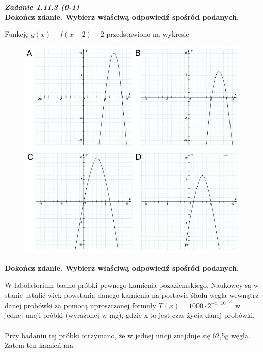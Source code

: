 \documentclass[12pt,a4paper]{article}
\theoremstyle{break}
\begin{document}
		\newpage
		\begin{mdframed}[%
			linecolor=white,%
			innertopmargin=\topskip,
			shadowsize=0,%
			innertopmargin=5,%
			innerbottommargin=5,%
			leftmargin=10,%
			rightmargin=10,%
			backgroundcolor=gray!20,%
			innertopmargin=0pt,]
			\vspace{0.2cm}
			\textbf{\textit{Zadanie 1.11.3 (0-1)}}\\
			\textbf{Dokończ zdanie. Wybierz właściwą odpowiedź spośród podanych.}
			
		\end{mdframed}
	
	Funkcję $g(x)-f(x-2)-2$ przedstawiono na wykresie
	
		\begin{figure}[h]
			\centering
			\includegraphics[scale=0.5]{pm2.jpeg}
		\end{figure}
	
	
	\begin{zad}[0-1]
		\textbf{Dokończ zdanie. Wybierz właściwą odpowiedź spośród podanych.}
	\end{zad} 
	
	W labolatorium badno próbki pewnego kamienia pozaziemskiego. Naukowcy są w stanie ustalić wiek powstania danego kamienia na postawie śladu węgla wewnątrz danej probówki za pomocą uproszczonej formuły $T(x)= 1000\cdot2^{-x \cdot 10^{-10}}$ w jednej uncji próbki (wyrażonej w mg), gdzie x to jest czas życia danej probówki.
	\\\\
	Przy badaniu tej próbki otrzymano, że w jednej uncji znajduje się 62,5g węgla. Zatem ten kamień ma
	
\end{document}
